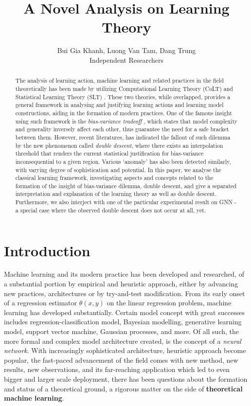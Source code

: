 \documentclass[10pt,oneside,oldfontcommands,dvipsnames,article]{memoir}
\title{A Novel Analysis on Learning Theory}
\author{Bui Gia Khanh, Luong Van Tam, Dang Trung\\ Independent Researchers}
\begin{document}
\maketitle




\begin{abstract}
    The analysis of learning action, machine learning and related practices in the field theoretically has been made by utilizing Computational Learning Theory (CoLT) \cite{10.1145/1968.1972} and Statistical Learning Theory (SLT) \cite{Vapnik1999-VAPTNO}. These two theories, while overlapped, provides a general framework in analysing and justifying learning actions and learning model constructions, aiding in the formation of modern practices. One of the famous insight using such framework is the \textit{bias-variance tradeoff} \cite{6797087}, which states that model complexity and generality inversely affect each other, thus guarantee the need for a safe bracket between them. However, recent literatures, \cite{belkin_reconciling_2019} has indicated the fallout of such dilemma by the new phenomenon called \textit{double descent}, where there exists an interpolation threshold that renders the current statistical justification for bias-variance inconsequential to a given region. Various `anomaly' has also been detected similarly, with varying degree of sophistication and potential. In this paper, we analyse the classical learning framework, investigating aspects and concepts related to the formation of the insight of bias-variance dilemma, double descent, and give a separated interpretation and explanation of the learning theory as well as double descent. Furthermore, we also interject with one of the particular experimental result on GNN - a special case where the observed double descent does not occur at all, yet.
\end{abstract}

\section{Introduction}

Machine learning and its modern practice has been developed and researched, of a substantial portion by empirical and heuristic approach, either by advancing new practices, architectures or by try-and-test modification. From its early onset of a regression estimator $\theta(x,y)$ on the linear regression problem, machine learning has developed substantially. Certain model concept with great successes includes regression-classification model, Bayesian modelling, generative learning model, support vector machine, Gaussian processes, and more. Of all such, the more formal and complex model architecture created, is the concept of a \textit{neural network}. With increasingly sophisticated architecture, heuristic approach become popular, the fast-paced advancement of the field comes with new method, new results, new observations, and its far-reaching application which led to even bigger and larger scale deployment, there has been questions about the formation and status of a theoretical ground, a rigorous matter on the side of \textbf{theoretical machine learning}.
\end{document}
